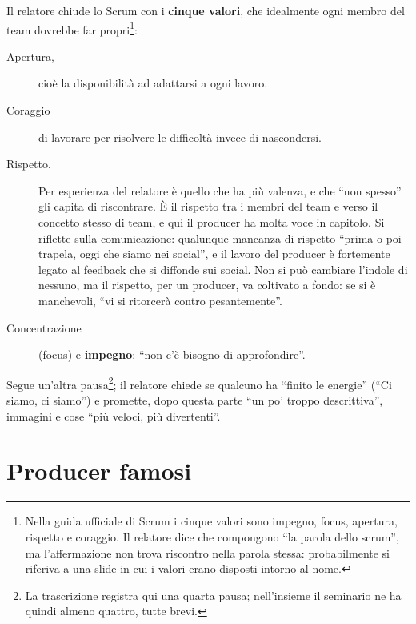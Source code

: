 Il relatore chiude lo Scrum con i \textbf{cinque valori}, che idealmente ogni
membro del team dovrebbe far propri\footnote{Nella guida ufficiale di Scrum i
cinque valori sono impegno, focus, apertura, rispetto e coraggio. Il relatore
dice che compongono ``la parola dello scrum'', ma l'affermazione non trova
riscontro nella parola stessa: probabilmente si riferiva a una slide in cui i
valori erano disposti intorno al nome.}:
\begin{description}
  \item[Apertura,] cioè la disponibilità ad adattarsi a ogni lavoro.
  \item[Coraggio] di lavorare per risolvere le difficoltà invece di
        nascondersi.
  \item[Rispetto.] Per esperienza del relatore è quello che ha più valenza, e
        che ``non spesso'' gli capita di riscontrare. È il rispetto tra i membri
        del team e verso il concetto stesso di team, e qui il producer ha molta
        voce in capitolo. Si riflette sulla comunicazione: qualunque mancanza di
        rispetto ``prima o poi trapela, oggi che siamo nei social'', e il lavoro
        del producer è fortemente legato al feedback che si diffonde sui
        social. Non si può cambiare l'indole di nessuno, ma il rispetto, per un
        producer, va coltivato a fondo: se si è manchevoli, ``vi si ritorcerà
        contro pesantemente''.
  \item[Concentrazione] (focus) e \textbf{impegno}: ``non c'è bisogno di
        approfondire''.
\end{description}
Segue un'altra pausa\footnote{La trascrizione registra qui una quarta pausa;
nell'insieme il seminario ne ha quindi almeno quattro, tutte brevi.}; il
relatore chiede se qualcuno ha ``finito le energie'' (``Ci siamo, ci siamo'') e
promette, dopo questa parte ``un po' troppo descrittiva'', immagini e cose ``più
veloci, più divertenti''.

\section{Producer famosi}
\label{sec:z5-famosi}

